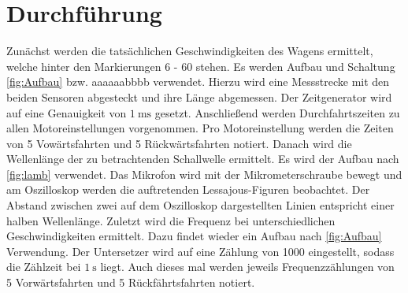 
\section{Durchführung}
\label{sec:Durchführung}

\renewcommand{\labelenumi}{\alph{enumi})}
Zunächst werden die tatsächlichen Geschwindigkeiten des Wagens ermittelt, welche
 hinter den Markierungen 6 - 60 stehen. Es werden Aufbau und Schaltung \ref{fig:Aufbau} bzw. aaaaaabbbb verwendet. Hierzu wird eine Messstrecke mit den
  beiden Sensoren abgesteckt und ihre Länge abgemessen. Der Zeitgenerator wird auf eine Genauigkeit von $\SI{1}{\milli\second}$ gesetzt. Anschließend werden
   Durchfahrtszeiten zu allen Motoreinstellungen vorgenommen. Pro Motoreinstellung
    werden die Zeiten von 5 Vowärtsfahrten und 5 Rückwärtsfahrten notiert. Danach
     wird die Wellenlänge der zu betrachtenden Schallwelle ermittelt. Es wird der Aufbau nach \ref{fig:lamb} verwendet.
      Das Mikrofon wird mit der Mikrometerschraube bewegt und am Oszilloskop werden
       die auftretenden Lessajous-Figuren beobachtet. Der Abstand zwischen zwei
        auf dem Oszilloskop dargestellten Linien entspricht einer halben Wellenlänge.
         Zuletzt wird die Frequenz bei unterschiedlichen Geschwindigkeiten ermittelt.
          Dazu findet wieder ein Aufbau nach \ref{fig:Aufbau} Verwendung. Der
          Untersetzer wird auf eine Zählung von 1000 eingestellt, sodass die Zählzeit bei $\SI{1}{\second}$ liegt.
          Auch dieses mal werden jeweils Frequenzzählungen von 5 Vorwärtsfahrten und 5 Rückfährtsfahrten notiert.
